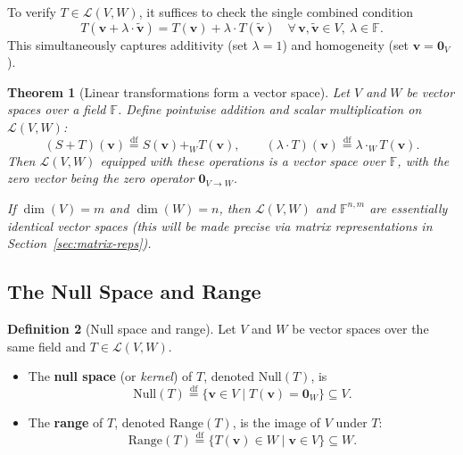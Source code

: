 \documentclass[11pt, a4paper, notitlepage]{report}
\newtheorem{theorem}{Theorem}[section]
\theoremstyle{definition}
\newtheorem{definition}[theorem]{Definition}
\theoremstyle{remark}
\begin{document}
\begin{keyresult}[title={Key Result: Concise Linearity Check}]
To verify $T \in \mathcal{L}(V,W)$, it suffices to check the single combined condition
\[
  T(\mathbf{v} + \lambda \cdot \tilde{\mathbf{v}}) = T(\mathbf{v}) + \lambda \cdot T(\tilde{\mathbf{v}})
  \quad \forall\, \mathbf{v}, \tilde{\mathbf{v}} \in V,\ \lambda \in \mathbb{F}.
\]
This simultaneously captures additivity (set $\lambda = 1$) and homogeneity (set $\mathbf{v} = \mathbf{0}_V$).
\end{keyresult}

\begin{theorem}[Linear transformations form a vector space]\label{thm:lt-vector-space}
Let $V$ and $W$ be vector spaces over a field $\mathbb{F}$. Define pointwise addition and scalar
multiplication on $\mathcal{L}(V,W)$:
\[
  (S + T)(\mathbf{v}) \stackrel{\mathrm{df}}{=} S(\mathbf{v}) +_W T(\mathbf{v}), \qquad
  (\lambda \cdot T)(\mathbf{v}) \stackrel{\mathrm{df}}{=} \lambda \cdot_W T(\mathbf{v}).
\]
Then $\mathcal{L}(V,W)$ equipped with these operations is a vector space over $\mathbb{F}$, with the zero
vector being the zero operator $\mathbf{0}_{V \to W}$.

If $\dim(V) = m$ and $\dim(W) = n$, then $\mathcal{L}(V,W)$ and $\mathbb{F}^{n,m}$ are essentially
identical vector spaces (this will be made precise via matrix representations in
Section~\ref{sec:matrix-reps}).
\end{theorem}

\subsection{The Null Space and Range}

\begin{definition}[Null space and range]\label{def:null-range}
Let $V$ and $W$ be vector spaces over the same field and $T \in \mathcal{L}(V,W)$.
\begin{itemize}
  \item The \textbf{null space} (or \emph{kernel}) of $T$, denoted $\mathrm{Null}(T)$, is
        \[
          \mathrm{Null}(T) \stackrel{\mathrm{df}}{=} \{\mathbf{v} \in V \mid T(\mathbf{v}) = \mathbf{0}_W\} \subseteq V.
        \]
  \item The \textbf{range} of $T$, denoted $\mathrm{Range}(T)$, is the image of $V$ under $T$:
        \[
          \mathrm{Range}(T) \stackrel{\mathrm{df}}{=} \{T(\mathbf{v}) \in W \mid \mathbf{v} \in V\} \subseteq W.
        \]
\end{itemize}
\end{definition}
\end{document}
